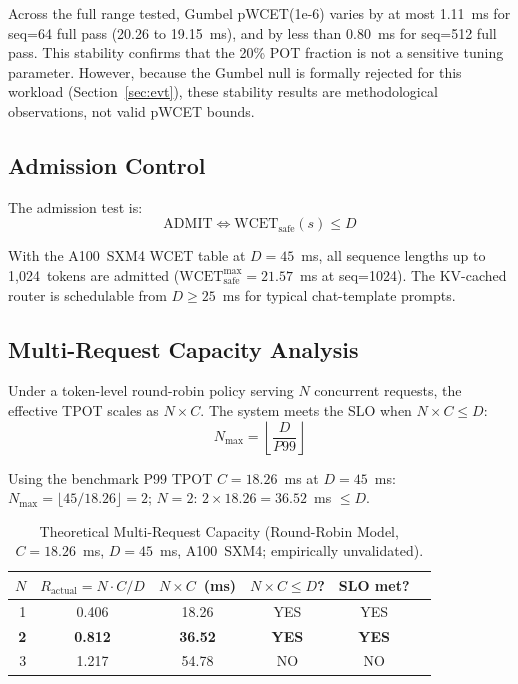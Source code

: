 \documentclass[conference]{IEEEtran}
\begin{document}
Across the full range tested, Gumbel pWCET(1e-6) varies by at most 1.11~ms
for seq=64 full pass (20.26 to 19.15~ms), and by less than 0.80~ms for
seq=512 full pass.
This stability confirms that the 20\% POT fraction is not a sensitive
tuning parameter.
However, because the Gumbel null is formally rejected for this workload
(Section~\ref{sec:evt}), these stability results are methodological
observations, not valid pWCET bounds.

\subsection{Admission Control}
\label{sec:admission}

The admission test is:
\begin{equation}
\text{ADMIT} \iff \text{WCET}_{\text{safe}}(s) \leq D
\label{eq:admit}
\end{equation}

With the A100~SXM4 WCET table at $D=45$~ms, all sequence lengths
up to 1{,}024~tokens are admitted
($\text{WCET}_{\text{safe}}^{\max} = 21.57$~ms at seq=1024).
The KV-cached router is schedulable from $D \geq 25$~ms for typical
chat-template prompts.

\subsection{Multi-Request Capacity Analysis}
\label{sec:capacity}

Under a token-level round-robin policy serving $N$ concurrent requests,
the effective TPOT scales as $N \times C$.
The system meets the SLO when $N \times C \leq D$:
\begin{equation}
N_{\max} = \left\lfloor \frac{D}{P99} \right\rfloor
\end{equation}

Using the benchmark P99 TPOT $C = 18.26$~ms at $D = 45$~ms:
$N_{\max} = \lfloor 45/18.26 \rfloor = 2$;
$N{=}2$: $2 \times 18.26 = 36.52$~ms $\leq D$.

\begin{table}[htbp]
\caption{Theoretical Multi-Request Capacity (Round-Robin Model,
         $C=18.26$~ms, $D=45$~ms, A100~SXM4; empirically unvalidated).}
\centering
\setlength{\tabcolsep}{4pt}
\begin{tabular}{@{}rccccc@{}}
\toprule
$N$ & $R_{\text{actual}}=N{\cdot}C/D$ & $N{\times}C$~(ms)
    & $N{\times}C \leq D$? & SLO met? \\
\midrule
1 & 0.406 & 18.26 & YES & YES \\
\textbf{2} & \textbf{0.812} & \textbf{36.52} & \textbf{YES} & \textbf{YES} \\
3 & 1.217 & 54.78 & NO  & NO \\
\bottomrule
\end{tabular}
\label{tab:capacity}
\end{table}
\end{document}
